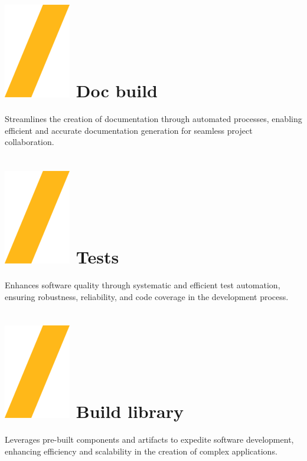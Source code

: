 \documentclass[a0paper,fleqn]{src/betterposter}
\begin{document}
{\section{\includegraphics[height=\fontcharht\font`\S]{img/general/slash.png} Doc build}
Streamlines the creation of documentation through automated processes, enabling
efficient and accurate documentation generation for seamless project
collaboration.

\section{\includegraphics[height=\fontcharht\font`\S]{img/general/slash.png} Tests}
Enhances software quality through systematic and efficient test automation,
ensuring robustness, reliability, and code coverage in the development process.




}{

\section{\includegraphics[height=\fontcharht\font`\S]{img/general/slash.png} Build library}
Leverages pre-built components and artifacts to expedite software development,
enhancing efficiency and scalability in the creation of complex applications.

}
\end{document}
